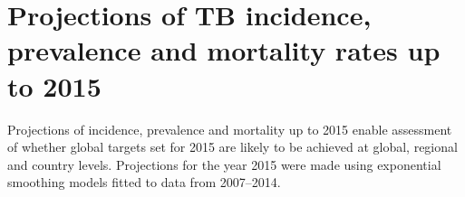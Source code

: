 \section{Projections of TB incidence, prevalence and mortality rates up to 2015} 

Projections of incidence, prevalence and mortality up to 2015 enable assessment of whether global targets set for 2015 are likely to be achieved at global, regional and country levels. Projections for the year 2015 were made using exponential smoothing models\cite{Hyndman2008-ax} fitted to data from 2007–2014.

